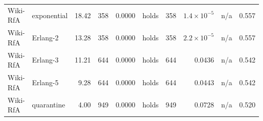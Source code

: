 \begin{table}[!t]
\begin{tabular}{@{}llrrrlrrlr@{}}
Wiki-RfA & exponential & 18.42 & 358 & 0.0000 & holds & 358 & $1.4\times10^{-5}$ & n/a & 0.557 \\
Wiki-RfA & Erlang-2 & 13.28 & 358 & 0.0000 & holds & 358 & $2.2\times10^{-5}$ & n/a & 0.557 \\
Wiki-RfA & Erlang-3 & 11.21 & 644 & 0.0000 & holds & 644 & 0.0436 & n/a & 0.542 \\
Wiki-RfA & Erlang-5 & 9.28 & 644 & 0.0000 & holds & 644 & 0.0443 & n/a & 0.542 \\
Wiki-RfA & quarantine & 4.00 & 949 & 0.0000 & holds & 949 & 0.0728 & n/a & 0.520 \\
\bottomrule
\end{tabular}
\end{table}
